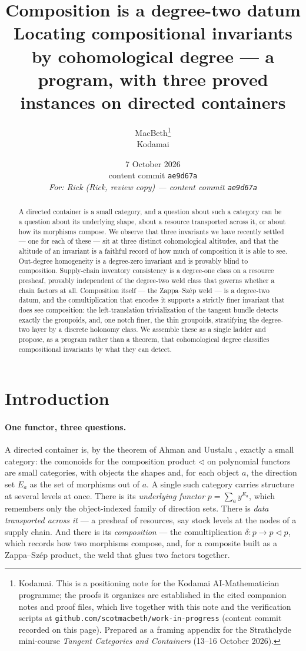 \documentclass[11pt]{article}
\title{Composition is a degree-two datum\\
\large Locating compositional invariants by cohomological degree ---
a program, with three proved instances on directed containers}
\author{MacBeth\thanks{Kodamai. This is a positioning note for the Kodamai
AI-Mathematician programme; the proofs it organizes are established in the cited companion notes
and proof files, which live together with this note and the verification scripts at
\texttt{github.com/scotmacbeth/work-in-progress} (content commit recorded on this page). Prepared
as a framing appendix for the Strathclyde mini-course \emph{Tangent Categories and Containers}
(13--16 October 2026).}\\
\small Kodamai}
\date{7 October 2026\\[2pt]
\small content commit \texttt{ae9d67a}\\[2pt]
\small\itshape For: Rick (Rick, review copy) --- content commit \texttt{ae9d67a}}
\theoremstyle{definition}
\newcommand{\lto}{\!\lhd\!}
\begin{document}
\maketitle

\begin{abstract}
A directed container is a small category, and a question about such a category can be a question
about its underlying shape, about a resource transported across it, or about how its morphisms
compose. We observe that three invariants we have recently settled --- one for each of these ---
sit at three distinct cohomological altitudes, and that the altitude of an invariant is a faithful
record of how much of composition it is able to see. Out-degree homogeneity is a degree-zero
invariant and is provably blind to composition. Supply-chain inventory consistency is a degree-one
class on a resource presheaf, provably independent of the degree-two weld class that governs
whether a chain factors at all. Composition itself --- the Zappa--Sz\'ep weld --- is a degree-two
datum, and the comultiplication that encodes it supports a strictly finer invariant that does see
composition: the left-translation trivialization of the tangent bundle detects exactly the
groupoids, and, one notch finer, the thin groupoids, stratifying the degree-two layer by a
discrete holonomy class. We assemble these as a single ladder and propose, as a program rather than
a theorem, that cohomological degree classifies compositional invariants by what they can detect.
\end{abstract}

\section{Introduction}\label{sec:intro}

\paragraph{One functor, three questions.}
A directed container is, by the theorem of Ahman and Uustalu \cite{AhmanUustalu2016}, exactly a
small category: the comonoids for the composition product $\lhd$ on polynomial functors are small
categories, with objects the shapes and, for each object $a$, the direction set $E_a$ as the set of
morphisms out of $a$. A single such category carries structure at several levels at once. There is
its \emph{underlying functor} $p=\sum_a y^{E_a}$, which remembers only the object-indexed family of
direction sets. There is \emph{data transported across it} --- a presheaf of resources, say stock
levels at the nodes of a supply chain. And there is its \emph{composition} --- the comultiplication
$\delta\colon p\to p\lto p$, which records how two morphisms compose, and, for a composite built as
a Zappa--Sz\'ep product, the weld that glues two factors together.
\end{document}

